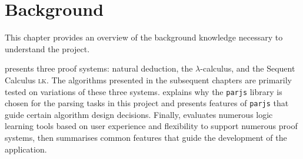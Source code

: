 \chapter{Background}\label{background}
This chapter provides an overview of the background knowledge necessary to understand the project.

 presents three proof systems: natural deduction, the $\lambda$-calculus, and the Sequent Calculus \textsc{lk}. The algorithms presented in the subsequent chapters are primarily tested on variations of these three systems.  explains why the \lstinline{parjs} library is chosen for the parsing tasks in this project and presents features of \lstinline{parjs} that guide certain algorithm design decisions. Finally,  evaluates numerous logic learning tools based on user experience and flexibility to support numerous proof systems, then summarises common features that guide the development of the application.




